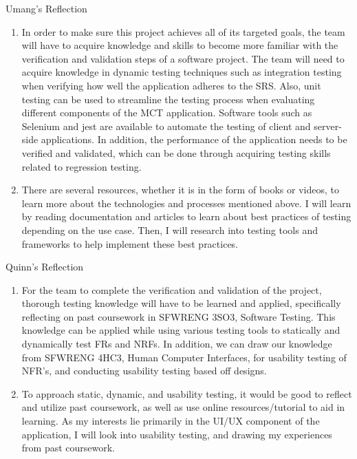 \documentclass[12pt, titlepage]{article}
\begin{document}
Umang's Reflection
\begin{enumerate}
    \item 
        In order to make sure this project achieves all of its targeted goals, the team will have to acquire knowledge and skills to become more familiar with the verification and validation steps of a software project. The team will need to acquire knowledge in dynamic testing techniques such as integration testing when verifying how well the application adheres to the SRS. Also, unit testing can be used to streamline the testing process when evaluating different components of the MCT application. Software tools such as Selenium and jest are available to automate the testing of client and server-side applications. In addition, the performance of the application needs to be verified and validated, which can be done through acquiring testing skills related to regression testing.

    \item There are several resources, whether it is in the form of books or videos, to learn more about the technologies and processes mentioned above. I will learn by reading documentation and articles to learn about best practices of testing depending on the use case. Then, I will research into testing tools and frameworks to help implement these best practices.
\end{enumerate}

Quinn's Reflection
\begin{enumerate}
    \item 
        For the team to complete the verification and validation of the project, thorough testing knowledge will have to be learned and applied, specifically reflecting on past coursework in SFWRENG 3SO3, Software Testing. This knowledge can be applied while using various testing tools to statically and dynamically test FRs and NRFs. In addition, we can draw our knowledge from SFWRENG 4HC3, Human Computer Interfaces, for usability testing of NFR's, and conducting usability testing based off designs.

    \item To approach static, dynamic, and usability testing, it would be good to reflect and utilize past coursework, as well as use online resources/tutorial to aid in learning. As my interests lie primarily in the UI/UX component of the application, I will look into usability testing, and drawing my experiences from past coursework.
\end{enumerate}
\end{document}
